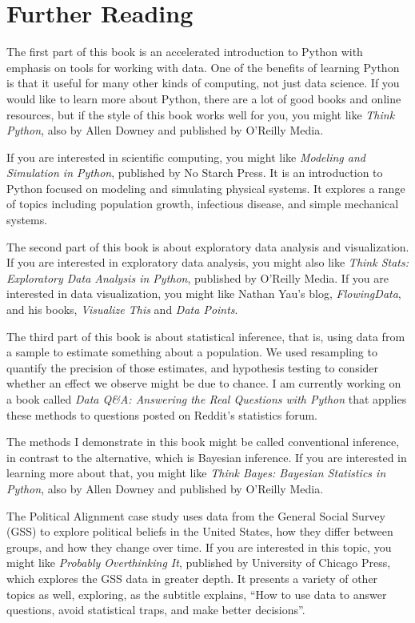 \chapter{Further Reading}\label{further-reading}

The first part of this book is an accelerated introduction to Python
with emphasis on tools for working with data. One of the benefits of
learning Python is that it useful for many other kinds of computing, not
just data science. If you would like to learn more about Python, there
are a lot of good books and online resources, but if the style of this
book works well for you, you might like \emph{Think Python}, also by
Allen Downey and published by O'Reilly Media.

If you are interested in scientific computing, you might like
\emph{Modeling and Simulation in Python}, published by No Starch Press.
It is an introduction to Python focused on modeling and simulating
physical systems. It explores a range of topics including population
growth, infectious disease, and simple mechanical systems.

The second part of this book is about exploratory data analysis and
visualization. If you are interested in exploratory data analysis, you
might also like \emph{Think Stats: Exploratory Data Analysis in Python},
published by O'Reilly Media. If you are interested in data
visualization, you might like Nathan Yau's blog, \emph{FlowingData}, and
his books, \emph{Visualize This} and \emph{Data Points}.

The third part of this book is about statistical inference, that is,
using data from a sample to estimate something about a population. We
used resampling to quantify the precision of those estimates, and
hypothesis testing to consider whether an effect we observe might be due
to chance. I am currently working on a book called \emph{Data Q\&A:
Answering the Real Questions with Python} that applies these methods to
questions posted on Reddit's statistics forum.

The methods I demonstrate in this book might be called conventional
inference, in contrast to the alternative, which is Bayesian inference.
If you are interested in learning more about that, you might like
\emph{Think Bayes: Bayesian Statistics in Python}, also by Allen Downey
and published by O'Reilly Media.

The Political Alignment case study uses data from the General Social
Survey (GSS) to explore political beliefs in the United States, how they
differ between groups, and how they change over time. If you are
interested in this topic, you might like \emph{Probably Overthinking
It}, published by University of Chicago Press, which explores the GSS
data in greater depth. It presents a variety of other topics as well,
exploring, as the subtitle explains, ``How to use data to answer
questions, avoid statistical traps, and make better decisions''.

